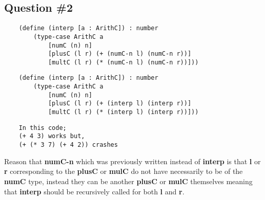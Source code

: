 \documentclass{article}
\begin{document}
\subsection*{Question \#2}

  \begin{verbatim}
    (define (interp [a : ArithC]) : number
        (type-case ArithC a
            [numC (n) n]
            [plusC (l r) (+ (numC-n l) (numC-n r))]
            [multC (l r) (* (numC-n l) (numC-n r))]))
  \end{verbatim}

  \begin{verbatim}
    (define (interp [a : ArithC]) : number
        (type-case ArithC a
            [numC (n) n]
            [plusC (l r) (+ (interp l) (interp r))]
            [multC (l r) (* (interp l) (interp r))]))
  \end{verbatim}
    
  \begin{verbatim}
    In this code;
    (+ 4 3) works but,
    (+ (* 3 7) (+ 4 2)) crashes
  \end{verbatim}
  
Reason that \textbf{numC-n} which was previously written instead of \textbf{interp} is that \textbf{l} or
\textbf{r} corresponding to the \textbf{plusC} or \textbf{mulC} do not have necessarily to be of the \textbf{numC}
type, instead they can be another \textbf{plusC} or  \textbf{mulC} themselves meaning that \textbf{interp} should
be recursively called for both \textbf{l} and \textbf{r}.




  
\end{document}
